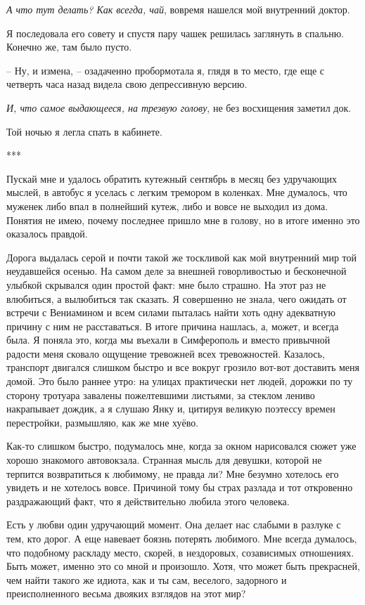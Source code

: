 \documentclass[
]{book}
\begin{document}
\emph{А что тут делать? Как всегда, чай}, вовремя нашелся мой внутренний доктор.

Я последовала его совету и спустя пару чашек решилась заглянуть в спальню. Конечно же, там было пусто.

-- Ну, и измена, -- озадаченно пробормотала я, глядя в то место, где еще с четверть часа назад видела свою депрессивную версию.

\emph{И, что самое выдающееся, на трезвую голову}, не без восхищения заметил док.

Той ночью я легла спать в кабинете.

***

Пускай мне и удалось обратить кутежный сентябрь в месяц без удручающих мыслей, в автобус я уселась с легким тремором в коленках. Мне думалось, что муженек либо впал в полнейший кутеж, либо и вовсе не выходил из дома. Понятия не имею, почему последнее пришло мне в голову, но в итоге именно это оказалось правдой.

Дорога выдалась серой и почти такой же тоскливой как мой внутренний мир той неудавшейся осенью. На самом деле за внешней говорливостью и бесконечной улыбкой скрывался один простой факт: мне было страшно. На этот раз не влюбиться, а вылюбиться так сказать. Я совершенно не знала, чего ожидать от встречи с Вениамином и всем силами пыталась найти хоть одну адекватную причину с ним не расставаться. В итоге причина нашлась, а, может, и всегда была. Я поняла это, когда мы въехали в Симферополь и вместо привычной радости меня сковало ощущение тревожней всех тревожностей. Казалось, транспорт двигался слишком быстро и все вокруг грозило вот-вот доставить меня домой. Это было раннее утро: на улицах практически нет людей, дорожки по ту сторону тротуара завалены пожелтевшими листьями, за стеклом лениво накрапывает дождик, а я слушаю Янку и, цитируя великую поэтессу времен перестройки, размышляю, как же мне хуёво.

Как-то слишком быстро, подумалось мне, когда за окном нарисовался сюжет уже хорошо знакомого автовокзала. Странная мысль для девушки, которой не терпится возвратиться к любимому, не правда ли? Мне безумно хотелось его увидеть и не хотелось вовсе. Причиной тому бы страх разлада и тот откровенно раздражающий факт, что я действительно любила этого человека.

Есть у любви один удручающий момент. Она делает нас слабыми в разлуке с тем, кто дорог. А еще навевает боязнь потерять любимого. Мне всегда думалось, что подобному раскладу место, скорей, в нездоровых, созависимых отношениях. Быть может, именно это со мной и произошло. Хотя, что может быть прекрасней, чем найти такого же идиота, как и ты сам, веселого, задорного и преисполненного весьма двояких взглядов на этот мир?
\end{document}
